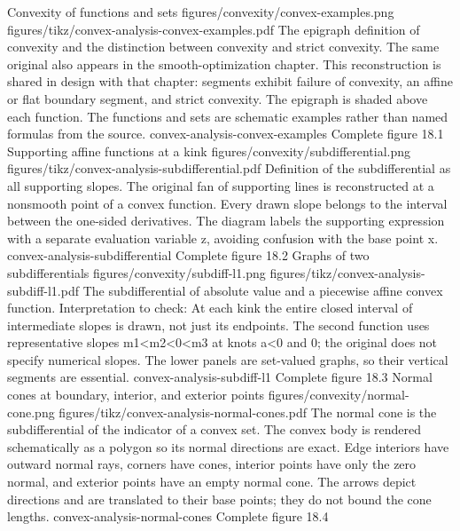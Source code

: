 {Convexity of functions and sets}
{figures/convexity/convex-examples.png}
{figures/tikz/convex-analysis-convex-examples.pdf}
{The epigraph definition of convexity and the distinction between convexity and strict convexity.}
{The same original also appears in the smooth-optimization chapter. This reconstruction is shared in design with that chapter: segments exhibit failure of convexity, an affine or flat boundary segment, and strict convexity. The epigraph is shaded above each function. The functions and sets are schematic examples rather than named formulas from the source.}
{convex-analysis-convex-examples}
{Complete figure}
{18.1}
{Supporting affine functions at a kink}
{figures/convexity/subdifferential.png}
{figures/tikz/convex-analysis-subdifferential.pdf}
{Definition of the subdifferential as all supporting slopes.}
{The original fan of supporting lines is reconstructed at a nonsmooth point of a convex function. Every drawn slope belongs to the interval between the one-sided derivatives. The diagram labels the supporting expression with a separate evaluation variable z, avoiding confusion with the base point x.}
{convex-analysis-subdifferential}
{Complete figure}
{18.2}
{Graphs of two subdifferentials}
{figures/convexity/subdiff-l1.png}
{figures/tikz/convex-analysis-subdiff-l1.pdf}
{The subdifferential of absolute value and a piecewise affine convex function.}
{Interpretation to check: At each kink the entire closed interval of intermediate slopes is drawn, not just its endpoints. The second function uses representative slopes m1<m2<0<m3 at knots a<0 and 0; the original does not specify numerical slopes. The lower panels are set-valued graphs, so their vertical segments are essential.}
{convex-analysis-subdiff-l1}
{Complete figure}
{18.3}
{Normal cones at boundary, interior, and exterior points}
{figures/convexity/normal-cone.png}
{figures/tikz/convex-analysis-normal-cones.pdf}
{The normal cone is the subdifferential of the indicator of a convex set.}
{The convex body is rendered schematically as a polygon so its normal directions are exact. Edge interiors have outward normal rays, corners have cones, interior points have only the zero normal, and exterior points have an empty normal cone. The arrows depict directions and are translated to their base points; they do not bound the cone lengths.}
{convex-analysis-normal-cones}
{Complete figure}
{18.4}

